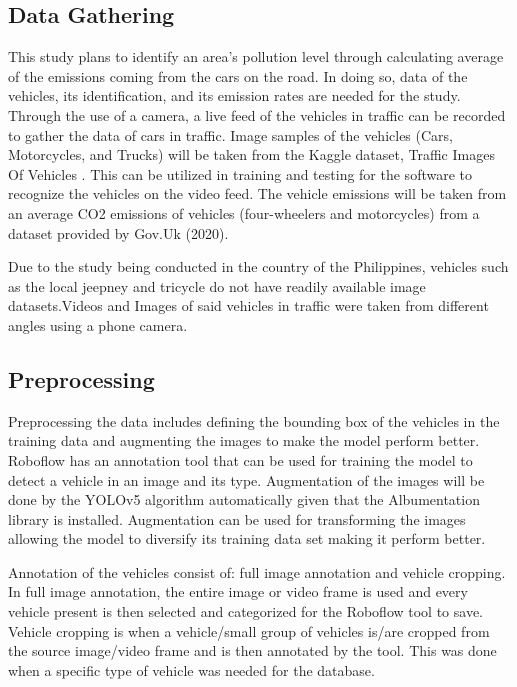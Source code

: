 \subsection {Data Gathering}
This study plans to identify an area’s pollution level through calculating average of the emissions coming from the cars on the road. In doing so, data of the vehicles, its identification, and its emission rates are needed for the study. Through the use of a camera, a live feed of the vehicles in traffic can be recorded to gather the data of cars in traffic. Image samples of the vehicles (Cars, Motorcycles, and Trucks) will be taken from the Kaggle dataset, Traffic Images Of Vehicles \cite{DVN/POREXF_2020}. This can be utilized in training and testing for the software to recognize the vehicles on the video feed. The vehicle emissions will be taken from an average CO2 emissions of vehicles (four-wheelers and motorcycles) from a dataset provided by Gov.Uk (2020). 

Due to the study being conducted in the country of the Philippines, vehicles such as the local jeepney and tricycle do not have readily available image datasets.Videos and Images of said vehicles in traffic were taken from different angles using a phone camera. 


\subsection {Preprocessing}

	Preprocessing the data includes defining the bounding box of the vehicles in the training data and augmenting the images to make the model perform better. Roboflow has an annotation tool that can be used for  training the model to detect a vehicle in an image and its type. Augmentation of the images will be done by the YOLOv5 algorithm automatically given that the Albumentation library is installed. Augmentation can be used for transforming the images allowing the model to diversify its training data set making it perform better.\cite{dilmegani} 
	
	Annotation of the vehicles consist of: full image annotation and vehicle cropping. In full image annotation, the entire image or video frame is used and every vehicle present is then selected and categorized for the Roboflow tool to save. Vehicle cropping is when a vehicle/small group of vehicles is/are cropped from the source image/video frame and is then annotated by the tool. This was done when a specific type of vehicle was needed for the database.
	


